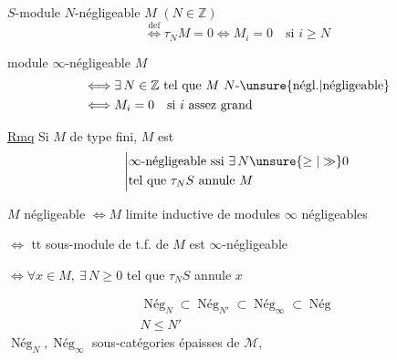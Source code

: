 $S$-module $N$-négligeable $M$ \quad $(N\in\mathbb Z)$
\[
\overset{\mathrm{def}}{\Longleftrightarrow}\tau_N M=0
\Longleftrightarrow M_i=0\quad\text{si }i\geq N
\]

module $\infty$-négligeable $M$
\[
\begin{aligned}
&\Longleftrightarrow \exists\,N\in\mathbb Z\ \text{tel que }M\ \text{$N$-\unsure{négl.|négligeable}}\\
&\Longleftrightarrow M_i=0\quad\text{si }i\text{ assez grand}
\end{aligned}
\]

\uline{Rmq} Si $M$ de type fini, $M$ est
\[
\left|\begin{aligned}
&\infty\text{-négligeable ssi }\exists\,N\unsure{\geq|\gg}0\\
&\text{tel que }\tau_N S\text{ annule }M
\end{aligned}\right.
\]

$M$ négligeable $\Longleftrightarrow M$ limite inductive de modules $\infty$ négligeables

$\Longleftrightarrow$ tt sous-module de t.f. de $M$ est $\infty$-négligeable

$\Longleftrightarrow\forall x\in M,\ \exists\,N\geq 0$ tel que $\tau_N S$ annule $x$

\[
\begin{gathered}
\operatorname{Nég}_N\subset\operatorname{Nég}_{N'}\subset\operatorname{Nég}_\infty\subset\operatorname{Nég}\\
N\leq N'
\end{gathered}
\]
$\operatorname{Nég}_N,\operatorname{Nég}_\infty$ sous-catégories épaisses de $\mathcal M$,
